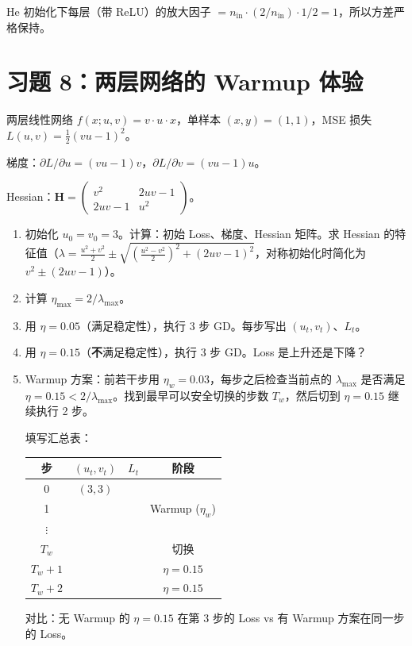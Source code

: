 \documentclass[12pt, a4paper]{ctexart}
\begin{document}
\begin{hint}
He 初始化下每层（带 ReLU）的放大因子 $= n_{\text{in}} \cdot (2/n_{\text{in}}) \cdot 1/2 = 1$，所以方差严格保持。
\end{hint}


\section*{习题 8：两层网络的 Warmup 体验}

两层线性网络 $f(x; u, v) = v \cdot u \cdot x$，单样本 $(x,y) = (1,1)$，MSE 损失 $L(u,v) = \frac{1}{2}(vu-1)^2$。

梯度：$\partial L/\partial u = (vu-1)v$，$\partial L/\partial v = (vu-1)u$。

Hessian：$\mathbf{H} = \begin{pmatrix} v^2 & 2uv-1 \\ 2uv-1 & u^2 \end{pmatrix}$。

\begin{enumerate}
    \item[(a)] 初始化 $u_0 = v_0 = 3$。计算：初始 Loss、梯度、Hessian 矩阵。求 Hessian 的特征值（$\lambda = \frac{u^2+v^2}{2} \pm \sqrt{(\frac{u^2-v^2}{2})^2 + (2uv-1)^2}$，对称初始化时简化为 $v^2 \pm (2uv-1)$）。
    
    \item[(b)] 计算 $\eta_{\max} = 2/\lambda_{\max}$。
    
    \item[(c)] 用 $\eta = 0.05$（满足稳定性），执行 3 步 GD。每步写出 $(u_t, v_t)$、$L_t$。
    
    \item[(d)] 用 $\eta = 0.15$（\textbf{不}满足稳定性），执行 3 步 GD。Loss 是上升还是下降？
    
    \item[(e)] Warmup 方案：前若干步用 $\eta_w = 0.03$，每步之后检查当前点的 $\lambda_{\max}$ 是否满足 $\eta = 0.15 < 2/\lambda_{\max}$。找到最早可以安全切换的步数 $T_w$，然后切到 $\eta = 0.15$ 继续执行 2 步。
    
    填写汇总表：
    \begin{center}
    \begin{tabular}{c|ccc}
    步 & $(u_t, v_t)$ & $L_t$ & 阶段 \\
    \hline
    0 & $(3, 3)$ & & \\
    1 & & & Warmup ($\eta_w$) \\
    $\vdots$ & & & \\
    $T_w$ & & & 切换 \\
    $T_w+1$ & & & $\eta = 0.15$ \\
    $T_w+2$ & & & $\eta = 0.15$ \\
    \end{tabular}
    \end{center}
    
    对比：无 Warmup 的 $\eta = 0.15$ 在第 3 步的 Loss vs 有 Warmup 方案在同一步的 Loss。
\end{enumerate}
\end{document}
